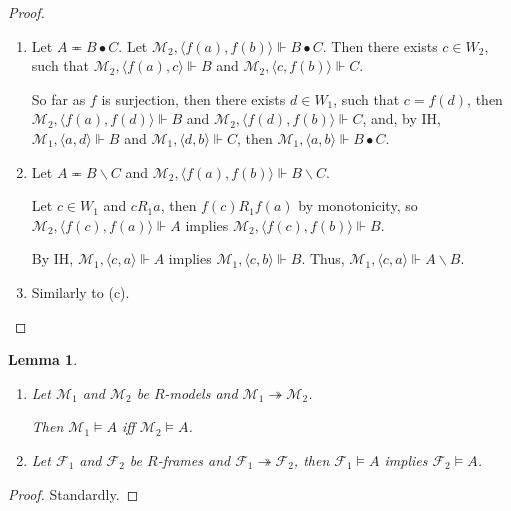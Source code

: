 \documentclass[a4paper]{article}
\theoremstyle{defin}
\theoremstyle{theorem}
\theoremstyle{prop}
\theoremstyle{lemma}
\newtheorem{lemma}{Lemma}
\theoremstyle{ex}
\theoremstyle{col}
\begin{document}
\begin{proof}
\begin{enumerate}
\begin{enumerate}
      \item Let $A \eqcirc B \bullet C$.
      Let $\mathcal{M}_2, \langle f(a), f(b) \rangle \Vdash B \bullet C$. Then
      there exists $c \in W_2$, such that $\mathcal{M}_2, \langle f(a), c \rangle \Vdash B$ and
      $\mathcal{M}_2, \langle c, f(b) \rangle \Vdash C$.

      So far as $f$ is surjection, then there exists $d \in W_1$, such that
      $c = f(d)$, then $\mathcal{M}_2, \langle f(a), f(d) \rangle \Vdash B$ and
      $\mathcal{M}_2, \langle f(d), f(b) \rangle \Vdash C$, and, by IH,
      $\mathcal{M}_1, \langle a, d \rangle \Vdash B$ and $\mathcal{M}_1, \langle d, b \rangle \Vdash C$,
      then $\mathcal{M}_1, \langle a, b \rangle \Vdash B \bullet C$.

      \item Let $A \eqcirc B \backslash C$ and $\mathcal{M}_2, \langle f(a), f(b) \rangle \Vdash B \backslash C$.

      Let $c \in W_1$ and $c R_1 a$, then $f(c) R_1 f(a)$ by monotonicity,
      so $\mathcal{M}_2, \langle f(c), f(a) \rangle \Vdash A$ implies
      $\mathcal{M}_2, \langle f(c), f(b) \rangle \Vdash B$.

      By IH, $\mathcal{M}_1, \langle c, a \rangle \Vdash A$ implies
      $\mathcal{M}_1, \langle c, b \rangle \Vdash B$. Thus, $\mathcal{M}_1, \langle c, a \rangle \Vdash A \backslash B$.
      \item Similarly to (c).
    \end{enumerate}
  \end{enumerate}
\end{proof}

\begin{lemma}
$ $

  \begin{enumerate}
    \item Let $\mathcal{M}_1$ and $\mathcal{M}_2$ be $R$-models and $\mathcal{M}_1 \twoheadrightarrow \mathcal{M}_2$.

    Then $\mathcal{M}_1 \models A$ iff $\mathcal{M}_2 \models A$.

    \item Let $\mathcal{F}_1$ and $\mathcal{F}_2$ be $R$-frames and $\mathcal{F}_1 \twoheadrightarrow \mathcal{F}_2$,
    then $\mathcal{F}_1 \models A$ implies $\mathcal{F}_2 \models A$.
  \end{enumerate}
\end{lemma}

\begin{proof}
  Standardly.
\end{proof}
\end{document}
